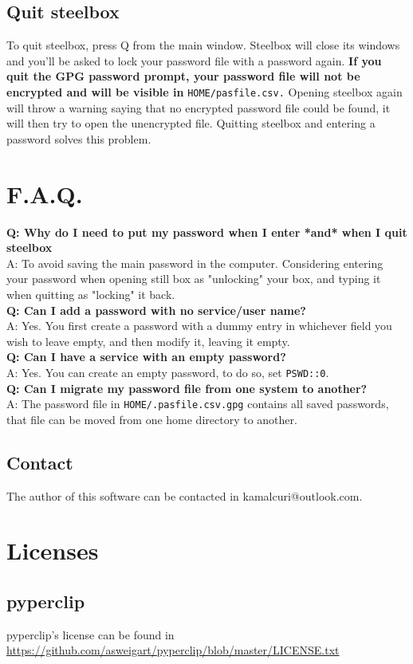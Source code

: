 \documentclass{article}
\begin{document}
  \subsection{Quit steelbox}
  To quit steelbox, press Q from the main window. Steelbox will close its windows and you'll be asked to lock your password file with a password again.
  \textbf{If you quit the GPG password prompt, your password file will not be encrypted and will be visible in} \texttt{\textdollar HOME/pasfile.csv.}
  Opening steelbox again will throw a warning saying that no encrypted password file could be found, it will then try to open the unencrypted file.
  Quitting steelbox and entering a password solves this problem.

  \section{F.A.Q.}
  \textbf{Q: Why do I need to put my password when I enter *and* when I quit steelbox}\\
  A: To avoid saving the main password in the computer. Considering entering your password when opening still box as "unlocking" your box, and typing
  it when quitting as "locking" it back.\\
  \textbf{Q: Can I add a password with no service/user name?}\\
  A: Yes. You first create a password with a dummy entry in whichever field you wish to leave empty, and then modify it, leaving it empty.\\
  \textbf{Q: Can I have a service with an empty password?}\\
  A: Yes. You can create an empty password, to do so, set \texttt{PSWD::0}.\\
  \textbf{Q: Can I migrate my password file from one system to another?}\\
  A: The password file in \texttt{\textdollar HOME/.pasfile.csv.gpg} contains all saved passwords, that file can be moved from one home directory to another.
  \subsection{Contact}
  The author of this software can be contacted in kamalcuri@outlook.com.

  \section{Licenses}
    \subsection{pyperclip}
    pyperclip's license can be found in \url{https://github.com/asweigart/pyperclip/blob/master/LICENSE.txt}
\end{document}
